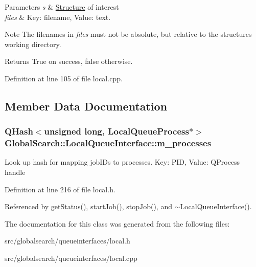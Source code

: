 \begin{DoxyParams}{Parameters}
{\em s} & \hyperlink{classGlobalSearch_1_1Structure}{Structure} of interest \\
\hline
{\em files} & Key\+: filename, Value\+: text.\\
\hline
\end{DoxyParams}
\begin{DoxyNote}{Note}
The filenames in {\itshape files} must not be absolute, but relative to the structure\textquotesingle{}s working directory.
\end{DoxyNote}
\begin{DoxyReturn}{Returns}
True on success, false otherwise. 
\end{DoxyReturn}


Definition at line 105 of file local.\+cpp.



\subsection{Member Data Documentation}
\hypertarget{classGlobalSearch_1_1LocalQueueInterface_a7a7326a16048896fd7c88d17e3973cda}{}
\subsubsection[{m\+\_\+processes}]{\setlength{\rightskip}{0pt plus 5cm}Q\+Hash$<$unsigned long, Local\+Queue\+Process$\ast$$>$ Global\+Search\+::\+Local\+Queue\+Interface\+::m\+\_\+processes\hspace{0.3cm}{\ttfamily [protected]}}\label{classGlobalSearch_1_1LocalQueueInterface_a7a7326a16048896fd7c88d17e3973cda}
Look up hash for mapping job\+I\+D\textquotesingle{}s to processes. Key\+: P\+I\+D, Value\+: Q\+Process handle 

Definition at line 216 of file local.\+h.



Referenced by get\+Status(), start\+Job(), stop\+Job(), and $\sim$\+Local\+Queue\+Interface().



The documentation for this class was generated from the following files\+:\begin{DoxyCompactItemize}
\item 
src/globalsearch/queueinterfaces/local.\+h\item 
src/globalsearch/queueinterfaces/local.\+cpp\end{DoxyCompactItemize}
